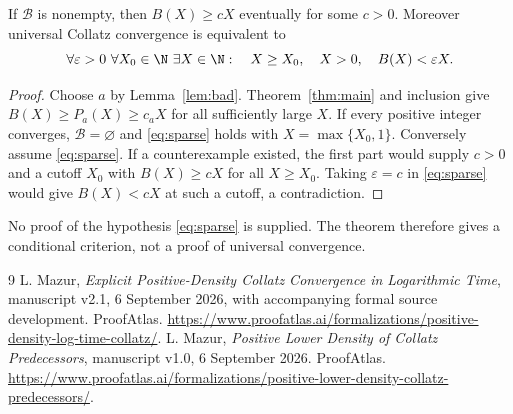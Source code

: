 \begin{theorem}
If $\mathcal B$ is nonempty, then $B(X)\ge cX$ eventually for some $c>0$.
Moreover universal Collatz convergence is equivalent to
\begin{equation}\label{eq:sparse}
 \forall\varepsilon>0\ \forall X_0\in\N\ \exists X\in\N:\quad
 X\ge X_0,\quad X>0,\quad B(X)<\varepsilon X.
\end{equation}
\end{theorem}
\begin{proof}
Choose $a$ by Lemma~\ref{lem:bad}. Theorem~\ref{thm:main} and inclusion
give $B(X)\ge P_a(X)\ge c_aX$ for all sufficiently large $X$.
If every positive integer converges, $\mathcal B=\varnothing$ and
\eqref{eq:sparse} holds with $X=\max\{X_0,1\}$.
Conversely assume \eqref{eq:sparse}. If a counterexample existed, the
first part would supply $c>0$ and a cutoff $X_0$ with $B(X)\ge cX$
for all $X\ge X_0$. Taking $\varepsilon=c$ in \eqref{eq:sparse}
would give $B(X)<cX$ at such a cutoff, a contradiction.
\end{proof}
No proof of the hypothesis \eqref{eq:sparse} is supplied. The theorem
therefore gives a conditional criterion, not a proof of universal convergence.

\begin{thebibliography}{9}
L. Mazur, \emph{Explicit Positive-Density Collatz Convergence in
Logarithmic Time}, manuscript v2.1, 6 September 2026, with accompanying
formal source development. ProofAtlas.
\url{https://www.proofatlas.ai/formalizations/positive-density-log-time-collatz/}.
L. Mazur, \emph{Positive Lower Density of Collatz Predecessors},
manuscript v1.0, 6 September 2026. ProofAtlas.
\url{https://www.proofatlas.ai/formalizations/positive-lower-density-collatz-predecessors/}.
\end{thebibliography}

